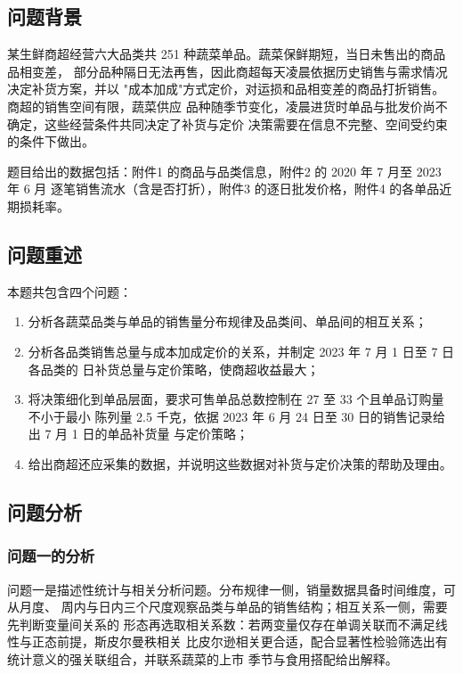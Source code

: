 
\subsection{问题背景}

某生鲜商超经营六大品类共 251 种蔬菜单品。蔬菜保鲜期短，当日未售出的商品品相变差，
部分品种隔日无法再售，因此商超每天凌晨依据历史销售与需求情况决定补货方案，并以
"成本加成"方式定价，对运损和品相变差的商品打折销售。商超的销售空间有限，蔬菜供应
品种随季节变化，凌晨进货时单品与批发价尚不确定，这些经营条件共同决定了补货与定价
决策需要在信息不完整、空间受约束的条件下做出。

题目给出的数据包括：附件1 的商品与品类信息，附件2 的 2020 年 7 月至 2023 年 6 月
逐笔销售流水（含是否打折），附件3 的逐日批发价格，附件4 的各单品近期损耗率。

\subsection{问题重述}

本题共包含四个问题：

\begin{enumerate}[label=（\arabic*）]
\item 分析各蔬菜品类与单品的销售量分布规律及品类间、单品间的相互关系；
\item 分析各品类销售总量与成本加成定价的关系，并制定 2023 年 7 月 1 日至 7 日各品类的
日补货总量与定价策略，使商超收益最大；
\item 将决策细化到单品层面，要求可售单品总数控制在 27 至 33 个且单品订购量不小于最小
陈列量 2.5 千克，依据 2023 年 6 月 24 日至 30 日的销售记录给出 7 月 1 日的单品补货量
与定价策略；
\item 给出商超还应采集的数据，并说明这些数据对补货与定价决策的帮助及理由。
\end{enumerate}

\subsection{问题分析}

\subsubsection{问题一的分析}

问题一是描述性统计与相关分析问题。分布规律一侧，销量数据具备时间维度，可从月度、
周内与日内三个尺度观察品类与单品的销售结构；相互关系一侧，需要先判断变量间关系的
形态再选取相关系数：若两变量仅存在单调关联而不满足线性与正态前提，斯皮尔曼秩相关
比皮尔逊相关更合适，配合显著性检验筛选出有统计意义的强关联组合，并联系蔬菜的上市
季节与食用搭配给出解释。

